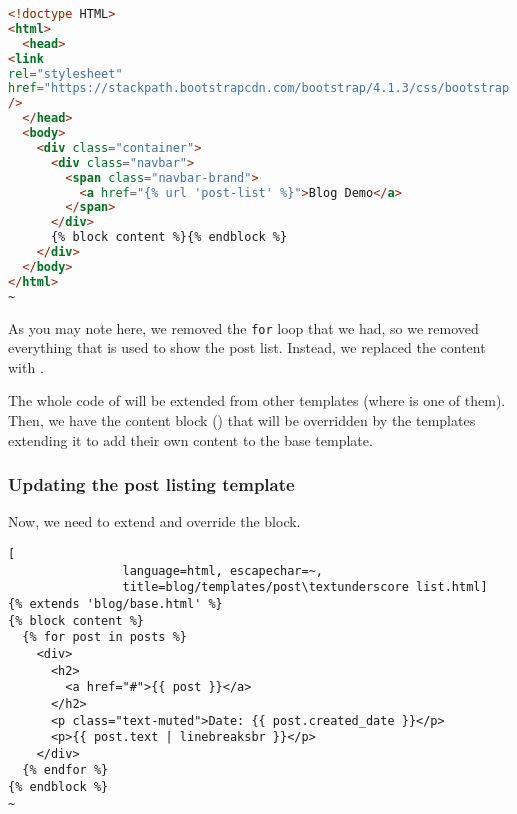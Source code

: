             \begin{lstlisting}[language=html, escapechar=~, title=blog/templates/base.html]
<!doctype HTML>
<html>
  <head>
<link
rel="stylesheet"
href="https://stackpath.bootstrapcdn.com/bootstrap/4.1.3/css/bootstrap.min.css"
/>
  </head>
  <body>
    <div class="container">
      <div class="navbar">
        <span class="navbar-brand">
          <a href="{% url 'post-list' %}">Blog Demo</a>
        </span>
      </div>
      {% block content %}{% endblock %}
    </div>
  </body>
</html>
~
            \end{lstlisting}
            
            As you may note here, we removed the \texttt{for} loop that we had,
            so we removed everything that is used to show the post list. Instead,
            we replaced the content with .
            
            The whole code of  will be extended from other templates
            (where  is one of them). Then, we have
            the content block ()
            that will be overridden by the templates extending it to add their own content 
            to the base template.
            
        \subsubsection{Updating the post listing template}
            Now, we need to extend  and override the  block.
            
            \begin{lstlisting}[
                language=html, escapechar=~, 
                title=blog/templates/post\textunderscore list.html]
{% extends 'blog/base.html' %}
{% block content %}
  {% for post in posts %}
    <div>
      <h2>
        <a href="#">{{ post }}</a>
      </h2>
      <p class="text-muted">Date: {{ post.created_date }}</p>
      <p>{{ post.text | linebreaksbr }}</p>
    </div>
  {% endfor %}
{% endblock %}
~
            \end{lstlisting}
